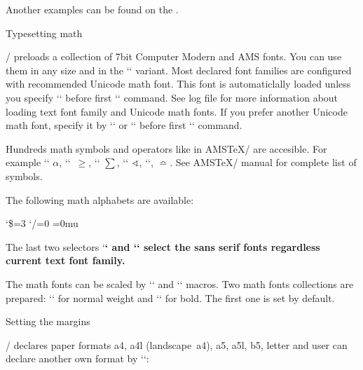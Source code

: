 {\begtt
\def\printbib{\hangindent=\parindent \indent \llap{\the\bibnum. }}
\def\printbib{\hangindent=\parindent \noindent [\the\bibmark]\quad}
\endtt 

Another examples can be found on the 
.


\sec Typesetting math

\OpTeX/ preloads a collection of 7bit Computer Modern and AMS fonts.
You can use them in any size and in the `\boldmath` variant. 
%
\new 
Most declared font families are configured with recommended Unicode
math font. This font is automaticlally loaded unless you specify
`\noloadmath` before first `\fontfam` command. See log file for more
information about loading text font family and Unicode math fonts. If you
prefer another Unicode math font, specify it by ``
or `` before first `\loadfam` command.

Hundreds math symbols and operators like in AMS\TeX/ are accesible. 
For example  `\alpha` $\alpha$, `\geq`~$\geq$, `\sum` $\sum$, 
`\sphericalangle` $\sphericalangle$, `\bumpeq`, $\bumpeq$. See AMS\TeX/
manual for complete list of symbols.

The following math alphabets are available:

\begtt    \catcode`\$=3 \catcode`/=0 \medmuskip=0mu \adef{ }{ }
\mit     %
\it      %
\rm      %
\cal     %
\script  %
\frak    %
\bbchar  %
\bf      %
\bi      %
\endtt

The last two selectors `\bf` and `\bi` select the sans serif fonts regardless
current text font family. 

The math fonts can be scaled by `\typosize` and `\typoscale` macros.
Two math fonts collections are prepared: `\normalmath` for normal weight
and `\boldmath` for bold. The first one is set by default.


\sec Setting the margins

\OpTeX/ declares paper formats a4, a4l (landscape~a4), a5, a5l, b5, letter and
user can declare another own format by `\sdef`:

}
